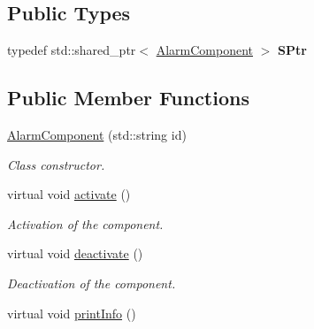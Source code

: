 \subsection*{Public Types}
\begin{DoxyCompactItemize}
\item 
typedef std\+::shared\+\_\+ptr$<$ \hyperlink{classAlarmComponent}{Alarm\+Component} $>$ {\bfseries S\+Ptr}\hypertarget{classAlarmComponent_a508e811a15269806af1a18aa4d387128}{}\label{classAlarmComponent_a508e811a15269806af1a18aa4d387128}

\end{DoxyCompactItemize}
\subsection*{Public Member Functions}
\begin{DoxyCompactItemize}
\item 
\hyperlink{classAlarmComponent_a4d10477bd20bbdb544e8a8ca8128add2}{Alarm\+Component} (std\+::string id)
\begin{DoxyCompactList}\small\item\em Class constructor. \end{DoxyCompactList}\item 
virtual void \hyperlink{classAlarmComponent_ab2acf6b580efe04bd617580ecb7323f1}{activate} ()\hypertarget{classAlarmComponent_ab2acf6b580efe04bd617580ecb7323f1}{}\label{classAlarmComponent_ab2acf6b580efe04bd617580ecb7323f1}

\begin{DoxyCompactList}\small\item\em Activation of the component. \end{DoxyCompactList}\item 
virtual void \hyperlink{classAlarmComponent_aef44069a068e92ccd15b3afcbd06dff6}{deactivate} ()\hypertarget{classAlarmComponent_aef44069a068e92ccd15b3afcbd06dff6}{}\label{classAlarmComponent_aef44069a068e92ccd15b3afcbd06dff6}

\begin{DoxyCompactList}\small\item\em Deactivation of the component. \end{DoxyCompactList}\item 
virtual void \hyperlink{classAlarmComponent_a51a7a6e0d85da344c741deddfcb7cff3}{print\+Info} ()\hypertarget{classAlarmComponent_a51a7a6e0d85da344c741deddfcb7cff3}{}\label{classAlarmComponent_a51a7a6e0d85da344c741deddfcb7cff3}


\end{DoxyCompactItemize}
